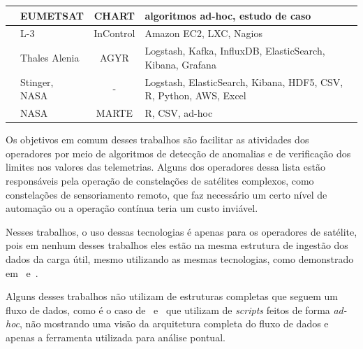 \begin{table}[htbp]
\begin{center}
\begin{tabular}{|C{8em}|C{6em}|c|C{10em}|}
			\hline
			\cite{trollopeAnalysisAutomatedTechniques2018} & EUMETSAT           & CHART                & algoritmos ad-hoc, estudo de caso                                                    \\
			\hline
			\cite{gillesFlyingLargeConstellations2016}     & L-3                & InControl            & Amazon EC2, LXC, Nagios                                                              \\
			\hline
			\cite{hennionBigdataSatelliteYearly2018}       & Thales Alenia      & AGYR                 & Logstash, Kafka, InfluxDB, ElasticSearch, Kibana, Grafana                            \\
			\hline
			\cite{mateikUsingBigData2017}                  & Stinger, NASA      & -                    & Logstash, ElasticSearch, Kibana, HDF5, CSV, R, Python, AWS, Excel                    \\
			\hline
			\cite{fernandezTelemetryAnomalyDetection2017}  & NASA               & MARTE                & R, CSV, ad-hoc                                                                       \\
			\hline
		\end{tabular}
	\end{center}
\end{table}

Os objetivos em comum desses trabalhos são facilitar as atividades dos operadores por meio de algoritmos de detecção de anomalias e de verificação dos limites nos valores das telemetrias.
Alguns dos operadores dessa lista estão responsáveis pela operação de constelações de satélites complexos, como constelações de sensoriamento remoto, que faz necessário um certo nível de automação ou a operação contínua teria um custo inviável.

Nesses trabalhos, o uso dessas tecnologias é apenas para os operadores de satélite, pois em nenhum desses trabalhos eles estão na mesma estrutura de ingestão dos dados da carga útil, mesmo utilizando as mesmas tecnologias, como demonstrado em~\cite{mateikUsingBigData2017} e~\cite{adamskiDataAnalyticsLarge2016}.

Alguns desses trabalhos não utilizam de estruturas completas que seguem um fluxo de dados, como é o caso de~\cite{fernandezTelemetryAnomalyDetection2017} e~\cite{trollopeAnalysisAutomatedTechniques2018} que utilizam de \textit{scripts} feitos de forma \textit{ad-hoc}, não mostrando uma visão da arquitetura completa do fluxo de dados e apenas a ferramenta utilizada para análise pontual.

